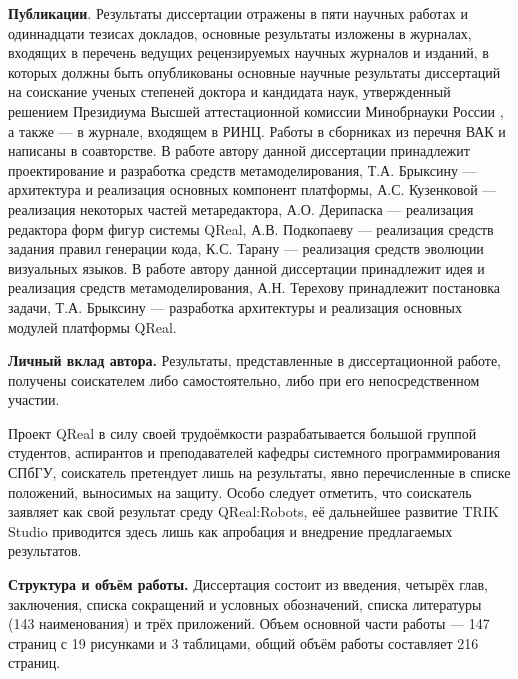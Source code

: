 \textbf{Публикации}. Результаты диссертации отражены в пяти научных работах и одиннадцати тезисах докладов, 
основные результаты изложены в журналах, входящих в перечень ведущих рецензируемых научных 
журналов и изданий, в которых должны быть опубликованы основные научные результаты диссертаций 
на соискание ученых степеней доктора и кандидата наук, утвержденный решением Президиума 
Высшей аттестационной комиссии Минобрнауки России ,
а также \cite{terekhov2009architecture, osechkina2010gestures} --- в журнале, входящем в РИНЦ. 
Работы в сборниках из перечня ВАК  и 
написаны в соавторстве. В работе  автору данной диссертации 
принадлежит проектирование и разработка средств метамоделирования, Т.А. Брыксину --- архитектура и реализация основных
компонент платформы, А.С. Кузенковой --- реализация некоторых частей метаредактора, А.О. Дерипаска
--- реализация редактора форм фигур системы QReal, А.В. Подкопаеву --- реализация средств задания правил генерации кода,
К.С. Тарану --- реализация средств эволюции визуальных языков. В работе 
автору данной диссертации принадлежит идея и реализация средств метамоделирования, А.Н. Терехову 
принадлежит постановка задачи, Т.А. Брыксину --- разработка архитектуры и реализация основных модулей платформы QReal.

\textbf{Личный вклад автора.} Результаты, представленные в диссертационной работе, получены 
соискателем либо самостоятельно, либо при его непосредственном участии.

Проект QReal в силу своей трудоёмкости разрабатывается большой группой студентов, аспирантов
и преподавателей кафедры системного программирования СПбГУ, соискатель претендует лишь на
результаты, явно перечисленные в списке положений, выносимых на защиту. Особо следует отметить,
что соискатель заявляет как свой результат среду QReal:Robots, её дальнейшее развитие 
TRIK Studio приводится здесь лишь как апробация и внедрение предлагаемых результатов.

\textbf{Структура и объём работы.} Диссертация состоит из введения, четырёх глав, заключения, 
списка сокращений и условных обозначений, списка литературы (143 наименования) и трёх 
приложений. Объем основной части работы --- 147 страниц с 19 рисунками и 3 таблицами, 
общий объём работы составляет 216 страниц.

